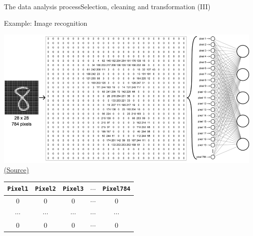 \documentclass[10pt,compress]{beamer} %
\begin{document}
\begin{frame}[fragile]{The data analysis process}{Selection, cleaning and transformation (III)}
	\begin{exampleblock}{Example: Image recognition}
	 \vspace{-0.3cm}
		\begin{center}
		\includegraphics[width=0.5\linewidth]{figs/8-Digit-Recognition}\\
    	\tiny{\href{https://lucenaresearch.com/deep-neural-networks/}{(Source)}}
		\end{center}

		\begin{center}
		\begin{tabular}{ccccc}\hline
		 \texttt{Pixel1}& \texttt{Pixel2} & \texttt{Pixel3} & $\cdots$ & \texttt{Pixel784} \\\hline
		 0     & 0      & 0      & $\cdots$ & 0                  \\
		 $\cdots$ & $\cdots$ & $\cdots$ & $\cdots$   & $\cdots$  \\
		 0     & 0      & 0      & $\cdots$ & 0                  \\
		 \hline
	 	\end{tabular}
	 	\end{center}
	 \vspace{-0.3cm}
	 \end{exampleblock}
\end{frame}
\end{document}
